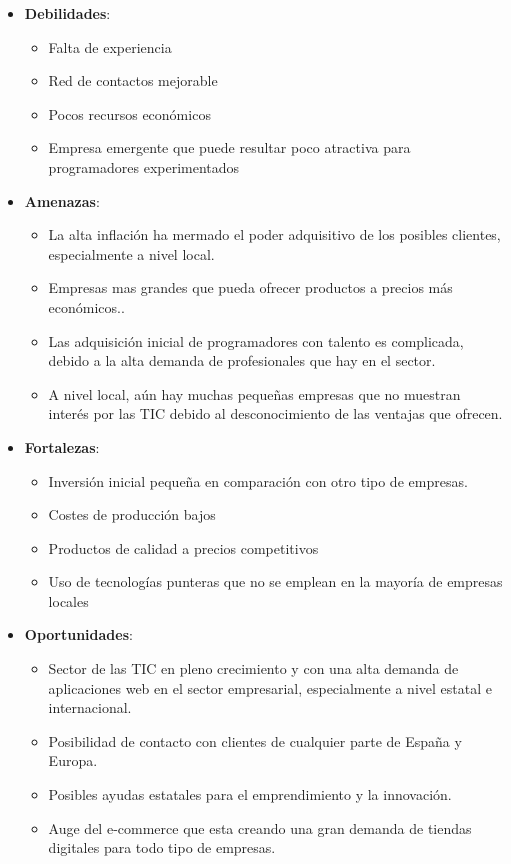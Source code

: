 \begin{itemize}
    \item \textbf{Debilidades}:
    \begin{itemize}
        \item Falta de experiencia
        \item Red de contactos mejorable
        \item Pocos recursos económicos
        \item Empresa emergente que puede resultar poco atractiva para programadores experimentados
    \end{itemize}

    \item \textbf{Amenazas}:
    \begin{itemize}
        \item La alta inflación ha mermado el poder adquisitivo de los posibles clientes, especialmente a nivel local.
        \item Empresas mas grandes que pueda ofrecer productos a precios más económicos..
        \item Las adquisición inicial de programadores con talento es complicada, debido a la  alta demanda de profesionales que hay en el sector.
        \item A nivel local, aún hay muchas pequeñas empresas que no muestran interés por las TIC debido al desconocimiento de las ventajas que ofrecen.
    \end{itemize}

    \item \textbf{Fortalezas}:
    \begin{itemize}
        \item Inversión inicial pequeña en comparación con otro tipo de empresas.
        \item Costes de producción bajos
        \item Productos de calidad a precios competitivos
        \item Uso de tecnologías punteras que no se emplean en la mayoría de empresas locales
    \end{itemize}

    \item \textbf{Oportunidades}:
    \begin{itemize}
        \item Sector de las TIC en pleno crecimiento y con una alta demanda de aplicaciones web en el sector 	empresarial, especialmente a nivel estatal e internacional.
        \item Posibilidad de contacto con clientes de cualquier parte de España y Europa.
        \item Posibles ayudas estatales para el emprendimiento y la innovación.
        \item Auge del e-commerce que esta creando una gran demanda de tiendas digitales para todo tipo de empresas.
    \end{itemize}
\end{itemize}

